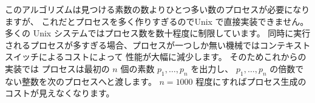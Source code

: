 このアルゴリズムは見つける素数の数よりひとつ多い数のプロセスが必要になりますが、
これだとプロセスを多く作りすぎるのでUnix で直接実装できません。
多くの Unix システムではプロセス数を数十程度に制限しています。
同時に実行されるプロセスが多すぎる場合、プロセスが一つしか無い機械ではコンテキストスイッチによるコストによって
性能が大幅に減少します。
そのためこれからの実装では
プロセスは最初の $n$ 個の素数 $p_1, \ldots, p_n$ を出力し、
$p_1, \ldots, p_n$ の倍数でない整数を次のプロセスへと渡します。
$n=1000$ 程度にすればプロセス生成のコストが見えなくなります。



